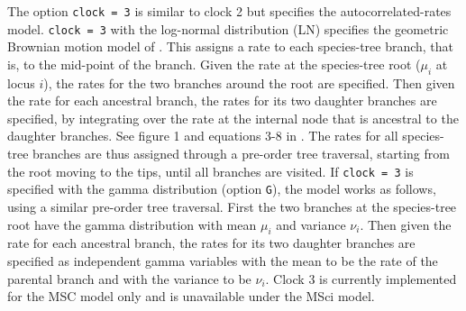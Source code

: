 \documentclass[a4paper]{book}
\numberwithin{equation}{section} \renewcommand{\baselinestretch}{0.55}
\begin{document}
The option \texttt{clock = 3} is similar to clock 2 but specifies the
autocorrelated-rates model. \texttt{clock = 3} with the log-normal
distribution (LN) specifies the geometric Brownian motion model of
\citet{Rannala2007}.  This assigns a rate to each species-tree branch,
that is, to the mid-point of the branch.  Given the rate at the
species-tree root ($\mu_i$ at locus $i$), the rates for the two
branches around the root are specified.  Then given the rate for each
ancestral branch, the rates for its two daughter branches are
specified, by integrating over the rate at the internal node that is
ancestral to the daughter branches. See figure 1 and equations 3-8 in
\citet{Rannala2007}.  The rates for all species-tree branches are thus
assigned through a pre-order tree traversal, starting from the root
moving to the tips, until all branches are visited.  If \texttt{clock
  = 3} is specified with the gamma distribution (option \texttt{G}),
the model works as follows, using a similar pre-order tree traversal.
First the two branches at the species-tree root have the gamma
distribution with mean $\mu_i$ and variance $\nu_i$.  Then given the
rate for each ancestral branch, the rates for its two daughter
branches are specified as independent gamma variables with the mean to
be the rate of the parental branch and with the variance to be
$\nu_i$.  Clock 3 is currently implemented for the MSC model only and
is unavailable under the MSci model.
\end{document}
